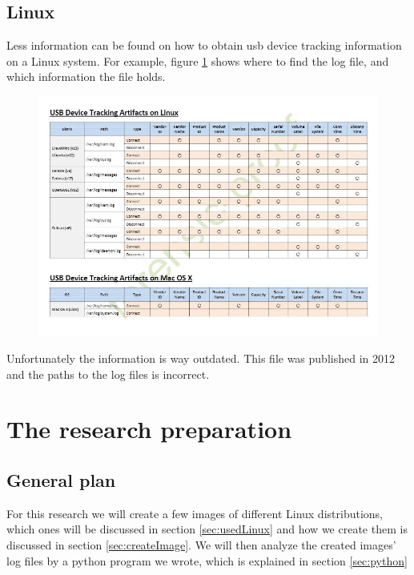 \documentclass[a4paper]{article}
\begin{document}
\subsection{Linux}
Less information can be found on how to obtain usb device tracking information
on a Linux system. For example, figure \ref{fig:linuxlog}
\cite{USBdeviceTracking} shows where to find the log file, and which information
the file holds.
\begin{figure}[h]
\includegraphics[width=\linewidth]{linux.jpg}
\label{fig:linuxlog}
\end{figure}
Unfortunately the information is way outdated. This file was published in 2012
and the paths to the log files is incorrect.




\section{The research preparation}
\label{sec:resprep}
\subsection{General plan}
For this research we will create a few images of different Linux distributions,
which ones will be discussed in section \ref{sec:usedLinux} and how we create
them is discussed in section \ref{sec:createImage}. We will then analyze the
created images' log files by a python program we wrote, which is explained in
section \ref{sec:python}
\end{document}
